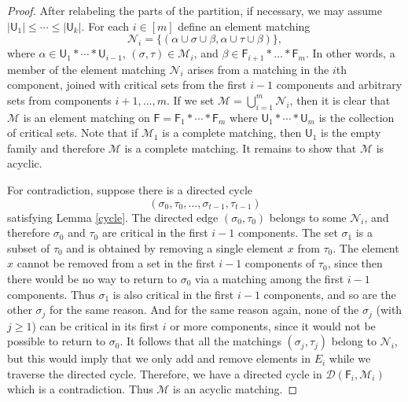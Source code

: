 \documentclass[10pt]{amsart}
\newcommand{\DD}{\mathcal{D}}
\theoremstyle{definition}
\begin{document}
	\begin{proof}
		After relabeling the parts of the partition, if necessary, we may assume $|\mathsf{U}_1| \leq \cdots \leq |\mathsf{U}_k|$. For each $i\in [m]$ define an element matching
		\[\mathcal{N}_i = \{(\alpha \cup \sigma \cup \beta, \alpha\cup \tau \cup \beta)\}, \]
		where $\alpha \in \mathsf{U}_1 * \cdots * \mathsf{U}_{i-1}$, $(\sigma, \tau)\in \mathcal{M}_i$, and  $\beta \in \mathsf{F}_{i+1} * \dots * \mathsf{F}_m$. 
		In other words, a member of the element matching $\mathcal{N}_i$ arises from a matching in the $i$th component, joined with critical sets from the first $i-1$ components and arbitrary sets from components $i+1, \dots, m$.
		If we set $\mathcal{M} = \bigcup_{i=1}^m \mathcal{N}_i$, then it is clear that $\mathcal{M}$ is an element matching on $\mathsf{F} = \mathsf{F}_1 * \cdots * \mathsf{F}_m$ where $\mathsf{U}_1 * \cdots * \mathsf{U}_m$ is the collection of critical sets. Note that if $\mathcal{M}_1$ is a complete matching, then $\mathsf{U}_1$ is the empty family and therefore  $\mathcal{M}$ is a complete matching. It remains to show that $\mathcal{M}$ is acyclic. 
		
		For contradiction, suppose there is a directed cycle 
		\[(\sigma_0, \tau_0, \dots, \sigma_{t-1}, \tau_{t-1})\]
		satisfying Lemma \ref{cycle}. The directed edge $(\sigma_0,\tau_0)$ belongs to some $\mathcal{N}_i$, and therefore $\sigma_0$ and $\tau_0$ are critical in the first $i-1$ components. The set $\sigma_1$ is a subset of $\tau_0$ and is obtained by removing a single element $x$ from $\tau_0$. The element $x$ cannot be removed from a set in the first $i-1$ components of $\tau_0$, since then there would be no way to return to $\sigma_0$ via a matching among the first $i-1$ components. Thus $\sigma_1$ is also critical in the first $i-1$ components, and so are the other $\sigma_j$ for the same reason. And for the same reason again, none of the $\sigma_j$ (with $j\geq 1$) can be critical in its first $i$ or more components, since it would not be possible to return to $\sigma_0$. It follows that all the matchings $(\sigma_j,\tau_j)$ belong to $\mathcal{N}_i$, but this would imply that we only add and remove elements in $E_i$ while we traverse the directed cycle. Therefore, we have a directed cycle in $\DD(\mathsf{F}_i,\mathcal{M}_i)$ which is a contradiction. Thus $\mathcal{M}$ is an acyclic matching.
	\end{proof}
	
\end{document}
